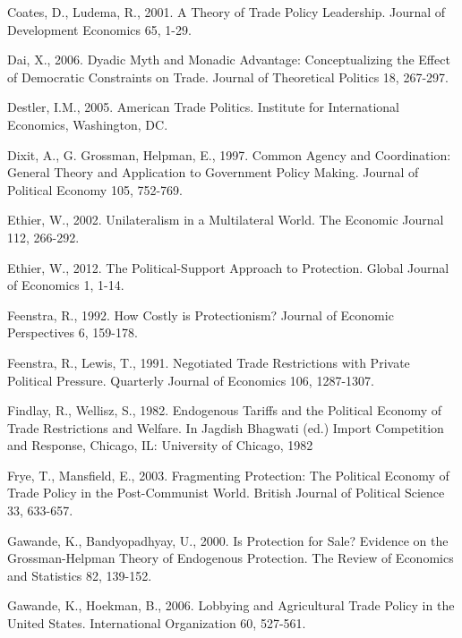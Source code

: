 \documentclass[10pt]{article}
\begin{document}
\begin{list}{}{\setlength{\leftmargin}{0.0in}\setlength{\rightmargin}{0.0in}\setlength{\itemindent}{0.0in}\setlength{\itemsep}{0.1in}}
\item Coates, D., Ludema, R., 2001. A Theory of Trade Policy Leadership. Journal of Development Economics 65, 1-29.

\item Dai, X., 2006. Dyadic Myth and Monadic Advantage: Conceptualizing the Effect of Democratic Constraints on Trade. Journal of Theoretical Politics 18, 267-297.

\item Destler, I.M., 2005. American Trade Politics. Institute for International Economics, Washington, DC.

\item Dixit, A., G. Grossman, Helpman, E., 1997. Common Agency and Coordination: General Theory and Application to Government Policy Making. Journal of Political Economy 105, 752-769.

\item Ethier, W., 2002. Unilateralism in a Multilateral World. The Economic Journal 112, 266-292.

\item Ethier, W., 2012. The Political-Support Approach to Protection. Global Journal of Economics 1, 1-14.

\item Feenstra, R., 1992. How Costly is Protectionism? Journal of Economic Perspectives 6, 159-178.

\item Feenstra, R., Lewis, T., 1991. Negotiated Trade Restrictions with Private Political Pressure. Quarterly Journal of Economics 106, 1287-1307.

\item Findlay, R., Wellisz, S., 1982. Endogenous Tariffs and the Political Economy of Trade Restrictions and Welfare. In Jagdish Bhagwati (ed.) Import Competition and Response, Chicago, IL: University of Chicago, 1982

\item Frye, T., Mansfield, E., 2003. Fragmenting Protection: The Political Economy of Trade Policy in the Post-Communist World. British Journal of Political Science 33, 633-657.

\item Gawande, K., Bandyopadhyay, U., 2000. Is Protection for Sale? Evidence on the Grossman-Helpman Theory of Endogenous Protection. The Review of Economics and Statistics 82, 139-152.

\item Gawande, K., Hoekman, B., 2006. Lobbying and Agricultural Trade Policy in the United States. International Organization 60, 527-561.


\end{list}
\end{document}
